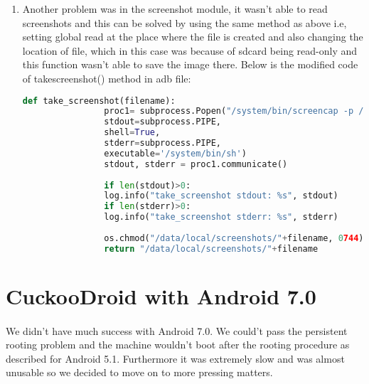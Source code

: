 \documentclass[../main.tex]{subfile}
\begin{document}
\begin{enumerate}
\begin{lstlisting}[language=python]
			# Parse the analysis configuration file generated by the agent.
			self.config = Config(cfg="analysis.conf")
			
			# We update the target according to its category. If it's a file, then
			# we store the path.
			if self.config.category == "file":
			self.target = os.path.join("/data/local/tmp", str(self.config.file_name))
			shutil.copyfile("config/hooks.json", "/data/local/tmp/hooks.json")
			os.chmod("/data/local/tmp/hooks.json", 0754) # Give set global read flag on hooks.json
			# If it's a URL, well.. we store the URL.
			else:
			self.target = self.config.target
		\end{lstlisting}
		
		\item Another problem was in the screenshot module, it wasn't able to read screenshots and this can be solved by using the same method as above i.e, setting global read at the place where the file is created and also changing the location of file, which in this case was because of sdcard being read-only and this function wasn't able to save the image there. Below is the modified code of take\textunderscore screenshot() method in adb file:
		\begin{lstlisting}[language=python]
			def take_screenshot(filename):
				proc1= subprocess.Popen("/system/bin/screencap -p /data/local/screenshots/"+filename, # "/data/local/screenshots/" Fix for /sdcard read only
				stdout=subprocess.PIPE,
				shell=True,
				stderr=subprocess.PIPE,
				executable='/system/bin/sh')
				stdout, stderr = proc1.communicate()
				
				if len(stdout)>0:
				log.info("take_screenshot stdout: %s", stdout)
				if len(stderr)>0:
				log.info("take_screenshot stderr: %s", stderr)
				
				os.chmod("/data/local/screenshots/"+filename, 0744)
				return "/data/local/screenshots/"+filename
		\end{lstlisting}
		
		\end{enumerate}
		
		\section{CuckooDroid with Android 7.0}
		\paragraph{} We didn't have much success with Android 7.0. We could't pass the persistent rooting problem and the machine wouldn't boot after the rooting procedure as described for Android 5.1. Furthermore it was extremely slow and was almost unusable so we decided to move on to more pressing matters.
		
\end{document}
